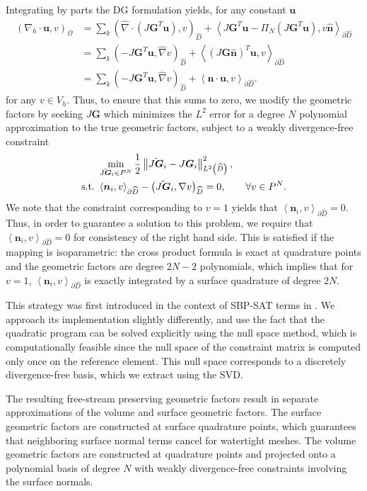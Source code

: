 \documentclass[preprint,10pt]{article}
\theoremstyle{definition}
\theoremstyle{lemma}
\theoremstyle{theorem}
\theoremstyle{assumption}
\renewcommand{\hat}{\widehat}
\newcommand{\nor}[1]{\left\| #1 \right\|}
\newcommand{\LRp}[1]{\left( #1 \right)}
\newcommand{\LRa}[1]{\left\langle #1 \right\rangle}
\newcommand{\Grad} {\ensuremath{\nabla}}
\renewcommand{\d}{\partial}
\begin{document}
Integrating by parts the DG formulation yields, for any constant $\bm{u}$
\begin{align*}
\LRp{\Grad_h \cdot \bm{u},v}_{\Omega} &= \sum_k \LRp{\hat{\Grad} \cdot \LRp{J\bm{G}^T\bm{u}},v }_{\hat{D}} + \LRa{J\bm{G}^T\bm{u} - \Pi_N \LRp{J\bm{G}^T\bm{u}}, v \hat{\bm{n}}}_{\d \hat{D}}\\
&= \sum_k \LRp{-J\bm{G}^T\bm{u},\hat{\Grad} v }_{\hat{D}} + \LRa{\LRp{J\bm{G}\hat{\bm{n}}}^T\bm{u}, v }_{\d \hat{D}}\\
&= \sum_k \LRp{-J\bm{G}^T\bm{u},\hat{\Grad} v }_{\hat{D}} + \LRa{\bm{n}\cdot \bm{u}, v }_{\d \hat{D}}.  
\end{align*}
for any $v\in V_h$.  
Thus, to ensure that this sums to zero, we modify the geometric factors by seeking $J\bm{G}$ which minimizes the $L^2$ error for a degree $N$ polynomial approximation to the true geometric factors, subject to a weakly divergence-free constraint
\begin{align*}
&\min_{\tilde{J\bm{G}}_i \in P^N} \frac{1}{2}\nor{\tilde{J\bm{G}}_i - J\bm{G}_i}_{L^2\LRp{\hat{D}}}^2,\\ 
{\rm s.t.\ } &\LRa{\bm{n}_i,v}_{\d \hat{D}}-\LRp{\tilde{J\bm{G}}_i,\Grad v}_{\hat{D}} = 0, \qquad \forall v\in P^N.
\end{align*}
We note that the constraint corresponding to $v = 1$ yields that $\LRa{\bm{n}_i,v}_{\d \hat{D}} = 0$.  Thus, in order to guarantee a solution to this problem, we require that $\LRa{\bm{n}_i,v}_{\d \hat{D}} = 0$ for consistency of the right hand side.  This is satisfied if the mapping is isoparametric: the cross product formula is exact at quadrature points and the geometric factors are degree $2N-2$ polynomials, which implies that for $v = 1$, $\LRa{\bm{n}_i,v}_{\d \hat{D}}$ is exactly integrated by a surface quadrature of degree $2N$.

This strategy was first introduced in the context of SBP-SAT terms in \cite{fernandez2016simultaneous}.  We approach its implementation slightly differently, and use the fact that the quadratic program can be solved explicitly using the null space method, which is computationally feasible since the null space of the constraint matrix is computed only once on the reference element.  This null space corresponds to a discretely divergence-free basis, which we extract using the SVD.  

The resulting free-stream preserving geometric factors result in separate approximations of the volume and surface geometric factors.  The surface geometric factors are constructed at surface quadrature points, which guarantees that neighboring surface normal terms cancel for watertight meshes.  The volume geometric factors are constructed at quadrature points and projected onto a polynomial basis of degree $N$ with weakly divergence-free constraints involving the surface normals.
\end{document}
